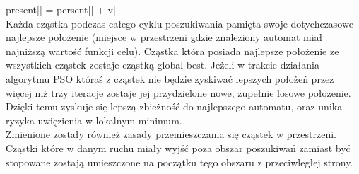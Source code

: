 \documentclass[runningheads,a4paper]{llncs}
\begin{document}
present[] = persent[] + v[] \\

Każda cząstka podczas całego cyklu poszukiwania pamięta swoje dotychczasowe najlepsze położenie (miejsce w przestrzeni gdzie znaleziony automat miał najniższą wartość funkcji celu). Cząstka która posiada najlepsze położenie ze wszystkich cząstek zostaje cząstką global best. Jeżeli w trakcie działania algorytmu PSO któraś z cząstek nie będzie zyskiwać lepszych położeń przez więcej niż trzy iteracje zostaje jej przydzielone nowe, zupełnie losowe położenie. Dzięki temu zyskuje się lepszą zbieżność do najlepszego automatu, oraz unika ryzyka uwięzienia w lokalnym minimum. \\

Zmienione zostały również zasady przemieszczania się cząstek w przestrzeni. Cząstki które w danym ruchu miały wyjść poza obszar poszukiwań zamiast być stopowane zostają umieszczone na początku tego obszaru z przeciwległej strony. \\
\end{document}
